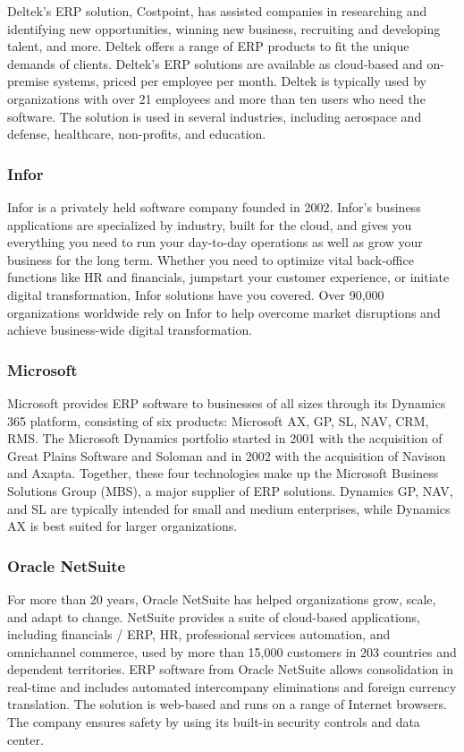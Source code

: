 Deltek’s ERP solution, Costpoint, has assisted companies in researching and identifying new opportunities, winning new business, recruiting and developing talent, and more. Deltek offers a range of ERP products to fit the unique demands of clients. Deltek’s ERP solutions are available as cloud-based and on-premise systems, priced per employee per month. Deltek is typically used by organizations with over 21 employees and more than ten users who need the software. The solution is used in several industries, including aerospace and defense, healthcare, non-profits, and education.  \cite{Nizar2021}


\subsubsection*{Infor}
Infor is a privately held software company founded in 2002. Infor’s business applications are specialized by industry, built for the cloud, and gives you everything you need to run your day-to-day operations as well as grow your business for the long term. Whether you need to optimize vital back-office functions like HR and financials, jumpstart your customer experience, or initiate digital transformation, Infor solutions have you covered. Over 90,000 organizations worldwide rely on Infor to help overcome market disruptions and achieve business-wide digital transformation.
\cite{Rachel2022}


\subsubsection*{Microsoft}
Microsoft provides ERP software to businesses of all sizes through its Dynamics 365 platform, consisting of six products: Microsoft AX, GP, SL, NAV, CRM, RMS. The Microsoft Dynamics portfolio started in 2001 with the acquisition of Great Plains Software and Soloman and in 2002 with the acquisition of Navison and Axapta. Together, these four technologies make up the Microsoft Business Solutions Group (MBS), a major supplier of ERP solutions. Dynamics GP, NAV, and SL are typically intended for small and medium enterprises, while Dynamics AX is best suited for larger organizations.

\cite{Robert2014}


\subsubsection*{Oracle NetSuite}
For more than 20 years, Oracle NetSuite has helped organizations grow, scale, and adapt to change. NetSuite provides a suite of cloud-based applications, including financials / ERP, HR, professional services automation, and omnichannel commerce, used by more than 15,000 customers in 203 countries and dependent territories. ERP software from Oracle NetSuite allows consolidation in real-time and includes automated intercompany eliminations and foreign currency translation. The solution is web-based and runs on a range of Internet browsers. The company ensures safety by using its built-in security controls and data center.

